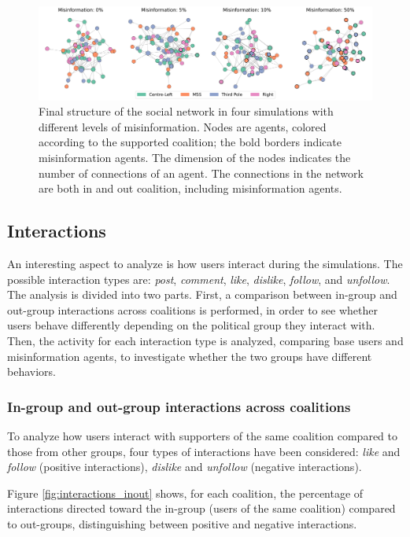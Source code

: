 \begin{figure}[h]
    \centering
    \includegraphics[width=1\linewidth]{Images/Network/graphs_DefaultRecSys.png}
    \caption{Final structure of the social network in four simulations with different levels of misinformation. 
    Nodes are agents, colored according to the supported coalition; the bold borders indicate misinformation agents. 
    The dimension of the nodes indicates the number of connections of an agent.
    The connections in the network are both in and out coalition, including misinformation agents.}
    \label{fig:network_structure}
\end{figure}


\subsection{Interactions}
An interesting aspect to analyze is how users interact during the simulations.
The possible interaction types are: \textit{post}, \textit{comment}, \textit{like}, \textit{dislike}, \textit{follow}, and \textit{unfollow}.
The analysis is divided into two parts.
First, a comparison between in-group and out-group interactions across coalitions is performed, in order to see whether users behave differently depending on the political group they interact with.
Then, the activity for each interaction type is analyzed, comparing base users and misinformation agents, to investigate whether the two groups have different behaviors.

\subsubsection{In-group and out-group interactions across coalitions}
To analyze how users interact with supporters of the same coalition compared to those from other groups, four types of interactions have been considered: \textit{like} and \textit{follow} (positive interactions), \textit{dislike} and \textit{unfollow} (negative interactions).

Figure \ref{fig:interactions_inout} shows, for each coalition, the percentage of interactions directed toward the in-group (users of the same coalition) compared to out-groups, distinguishing between positive and negative interactions.

